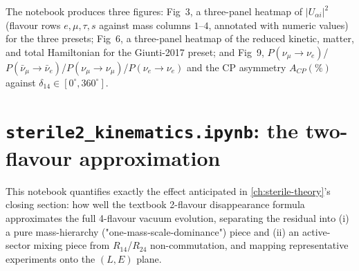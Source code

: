 The notebook produces three figures: Fig~3, a three-panel heatmap of
$|U_{\alpha i}|^2$ (flavour rows $e,\mu,\tau,s$ against mass columns
$1$--$4$, annotated with numeric values) for the three presets; Fig~6, a
three-panel heatmap of the reduced kinetic, matter, and total Hamiltonian
for the Giunti-2017 preset; and Fig~9, $P(\nu_\mu\to\nu_e)$/$P(\bar\nu_\mu\to\bar\nu_e)$/$P(\nu_\mu\to\nu_\mu)$/$P(\nu_e\to\nu_e)$
and the CP asymmetry $A_{CP}(\%)$ against $\delta_{14}\in[0^\circ,360^\circ]$.

\section{\texttt{sterile2\_kinematics.ipynb}: the two-flavour approximation}
\label{sec:results-kinematics}

\begin{implbox}
This notebook quantifies exactly the effect anticipated in
\cref{ch:sterile-theory}'s closing section: how well the textbook
2-flavour disappearance formula approximates the full 4-flavour vacuum
evolution, separating the residual into (i) a pure mass-hierarchy
("one-mass-scale-dominance") piece and (ii) an active-sector mixing piece
from $R_{14}$/$R_{24}$ non-commutation, and mapping representative
experiments onto the $(L,E)$ plane.
\end{implbox}

